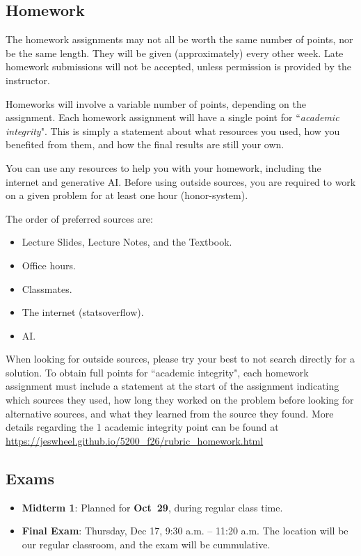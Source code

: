 \documentclass[11pt]{article}\usepackage[]{graphicx}\usepackage[]{xcolor}
\begin{document}
\subsection{Homework}

The homework assignments may not all be worth the same number of points, nor be the same length.
They will be given (approximately) every other week.
Late homework submissions will not be accepted, unless permission is provided by the instructor.

Homeworks will involve a variable number of points, depending on the assignment.
Each homework assignment will have a single point for ``\emph{academic integrity}".
This is simply a statement about what resources you used, how you benefited from them, and how the final results are still your own.


You can use any resources to help you with your homework, including the internet and generative AI.
Before using outside sources, you are required to work on a given problem for at least one hour (honor-system).

The order of preferred sources are:
\begin{itemize}
  \item Lecture Slides, Lecture Notes, and the Textbook.
  \item Office hours.
  \item Classmates.
  \item The internet (statsoverflow).
  \item AI.
\end{itemize}
When looking for outside sources, please try your best to not search directly for a solution.
To obtain full points for ``academic integrity", each homework assignment must include a statement at the start of the assignment indicating which sources they used, how long they worked on the problem before looking for alternative sources, and what they learned from the source they found.
More details regarding the 1 academic integrity point can be found at \url{https://jeswheel.github.io/5200\_f26/rubric\_homework.html} 

\subsection{Exams}\label{sec:exams}

\begin{itemize}
  \item \textbf{Midterm 1}: Planned for {\color{blue} \textbf{Oct~29}}, during regular class time.
  \item \textbf{Final Exam}: Thursday, Dec 17, 9:30 a.m. -- 11:20 a.m. The location will be our regular classroom, and the exam will be cummulative.
\end{itemize}
\end{document}
